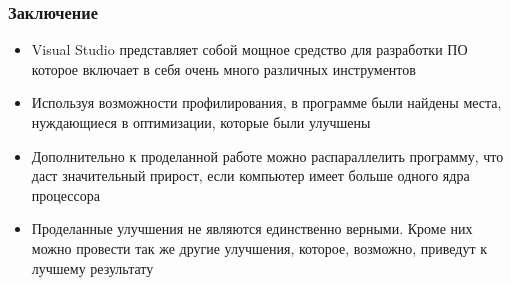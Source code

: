 \documentclass[10pt]{beamer}
\begin{document}
\begin{frame}
\frametitle{Заключение}


\begin{block}{}
  \begin{itemize}
    \item Visual Studio представляет собой мощное средство для разработки ПО которое включает в себя очень много различных инструментов
    \item Используя возможности профилирования, в программе были найдены места, нуждающиеся в оптимизации, которые были улучшены
    \item Дополнительно к проделанной работе можно распараллелить программу, что даст значительный прирост, если компьютер имеет больше одного ядра процессора
    \item Проделанные улучшения не являются единственно верными. Кроме них можно провести так же другие улучшения, которое, возможно, приведут к лучшему результату
  \end{itemize}
\end{block}


\end{frame}
\end{document}
